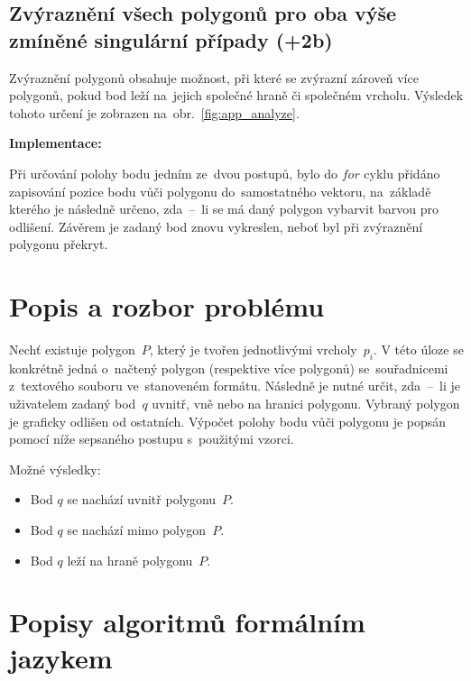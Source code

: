 \documentclass[a4paper, 12pt, oneside, titlepage]{article} %
\begin{document}
\subsection{Zvýraznění všech polygonů pro oba výše zmíněné singulární případy (+2b)}
Zvýraznění polygonů obsahuje možnost, při které se zvýrazní zároveň více polygonů, pokud bod leží na~jejich společné hraně či společném vrcholu. Výsledek tohoto určení je zobrazen na~obr.~\ref{fig:app_analyze}.

\noindent\textbf{Implementace:}

Při určování polohy bodu jedním ze~dvou postupů, bylo do $for$ cyklu přidáno zapisování pozice bodu vůči polygonu do~samostatného vektoru, na~základě kterého je následně určeno, zda~--~li se má daný polygon vybarvit barvou pro odlišení. Závěrem je zadaný bod znovu vykreslen, neboť byl při zvýraznění polygonu překryt. 


\section{Popis a rozbor problému}
Nechť existuje polygon~$P$, který je tvořen jednotlivými vrcholy~$p_i$. V této úloze se konkrétně jedná o~načtený polygon (respektive více polygonů) se~souřadnicemi z~textového souboru ve~stanoveném formátu. Následně je nutné určit, zda~--~li je uživatelem zadaný bod~$q$ uvnitř, vně nebo na hranici polygonu. Vybraný polygon je graficky odlišen od ostatních. Výpočet polohy bodu vůči polygonu je popsán pomocí níže sepsaného postupu s~použitými vzorci.

Možné výsledky:
\begin{itemize}
\item Bod $q$ se nachází uvnitř polygonu~$P$.
\item Bod $q$ se nachází mimo polygon~$P$.
\item Bod $q$ leží na hraně polygonu~$P$.
\end{itemize}


\section{Popisy algoritmů formálním jazykem}
\end{document}
